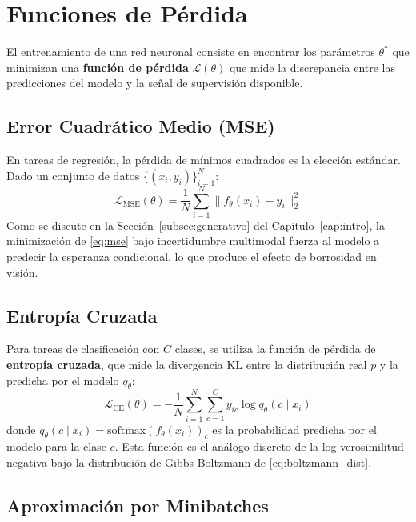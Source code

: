 \section{Funciones de Pérdida}
\label{sec:loss_functions}

El entrenamiento de una red neuronal consiste en encontrar los parámetros $\theta^*$ que minimizan una \textbf{función de pérdida} $\mathcal{L}(\theta)$ que mide la discrepancia entre las predicciones del modelo y la señal de supervisión disponible.

\subsection{Error Cuadrático Medio (MSE)}
\label{subsec:mse}

En tareas de regresión, la pérdida de mínimos cuadrados es la elección estándar. Dado un conjunto de datos $\{(x_i, y_i)\}_{i=1}^N$:
\begin{equation}
\label{eq:mse}
\mathcal{L}_{\text{MSE}}(\theta) = \frac{1}{N} \sum_{i=1}^N \| f_\theta(x_i) - y_i \|_2^2
\end{equation}
Como se discute en la Sección~\ref{subsec:generativo} del Capítulo~\ref{cap:intro}, la minimización de \eqref{eq:mse} bajo incertidumbre multimodal fuerza al modelo a predecir la esperanza condicional, lo que produce el efecto de borrosidad en visión.

\subsection{Entropía Cruzada}
\label{subsec:cross_entropy}

Para tareas de clasificación con $C$ clases, se utiliza la función de pérdida de \textbf{entropía cruzada}, que mide la divergencia KL entre la distribución real $p$ y la predicha por el modelo $q_\theta$:
\begin{equation}
\label{eq:cross_entropy}
\mathcal{L}_{\text{CE}}(\theta) = -\frac{1}{N} \sum_{i=1}^N \sum_{c=1}^C y_{ic} \log q_\theta(c \mid x_i)
\end{equation}
donde $q_\theta(c \mid x_i) = \text{softmax}(f_\theta(x_i))_c$ es la probabilidad predicha por el modelo para la clase $c$. Esta función es el análogo discreto de la log-verosimilitud negativa bajo la distribución de Gibbs-Boltzmann de \eqref{eq:boltzmann_dist}.

\subsection{Aproximación por Minibatches}
\label{subsec:minibatch}

